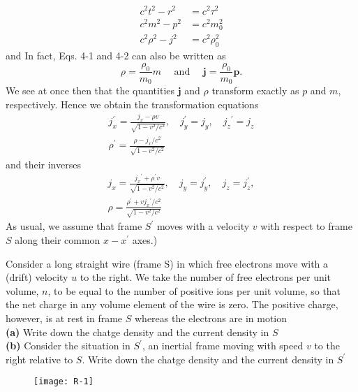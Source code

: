 $$
\begin{aligned}
c^{2} t^{2}-r^{2} &=c^{2} \tau^{2} \\
c^{2} m^{2}-p^{2} &=c^{2} m_{0}^{2} \\
c^{2} \rho^{2}-j^{2} &=c^{2} \rho_{0}^{2}
\end{aligned}
$$
and
In fact, Eqs. 4-1 and 4-2 can also be written as
$$
\rho=\frac{\rho_{0}}{m_{0}} m \quad \text { and } \quad \mathbf{j}=\frac{\rho_{0}}{m_{0}} \mathbf{p} .
$$
We see at once then that the quantities $\mathbf{j}$ and $\rho$ transform exactly as $p$ and $m$, respectively. Hence we obtain the transformation equations
$$
\begin{gathered}
j_{x}^{\prime}=\frac{j_{x}-\rho v}{\sqrt{1-v^{2} / c^{2}}}, \quad j_{y}^{\prime}=j_{y}, \quad j_{z}{ }^{\prime}=j_{z} \\
\rho^{\prime}=\frac{\rho-j_{x} / c^{2}}{\sqrt{1-v^{2} / c^{2}}}
\end{gathered}
$$
and their inverses
$$
\begin{gathered}
j_{x}=\frac{j_{x}{ }^{\prime}+\rho^{\prime} v}{\sqrt{1-v^{2} / c^{2}}}, \quad j_{y}=j_{y}^{\prime}, \quad j_{z}=j_{z}^{\prime}, \\
\rho=\frac{\rho^{\prime}+v j_{x}{ }^{\prime} / c^{2}}{\sqrt{1-v^{2} / c^{2}}}
\end{gathered}
$$
As usual, we assume that frame $S^{\prime}$ moves with a velocity $v$ with respect to frame $S$ along their common $x-x^{\prime}$ axes.)
\begin{exercise}
 Consider a long straight wire (frame S) in which free electrons move with a (drift) velocity $u$ to the right. We take the number of free electrons per unit volume, $n$, to be equal to the number of positive ions per unit volume, so that the net charge in any volume element of the wire is zero. The positive charge, however, is at rest in frame $S$ whereas the electrons are in motion\\
 \textbf{(a) }Write down the chatge density and the current density in $S$\\
 \textbf{(b) }Consider the situation in $S^\prime$, an inertial frame moving with speed $v$ to the right relative to $S$. Write down the chatge density and the current density in $S^\prime$
 \begin{figure}[H]
 	\centering
 	\texttt{[image: R-1]}
 	\caption{}
 	\label{}
 \end{figure}
\end{exercise}
